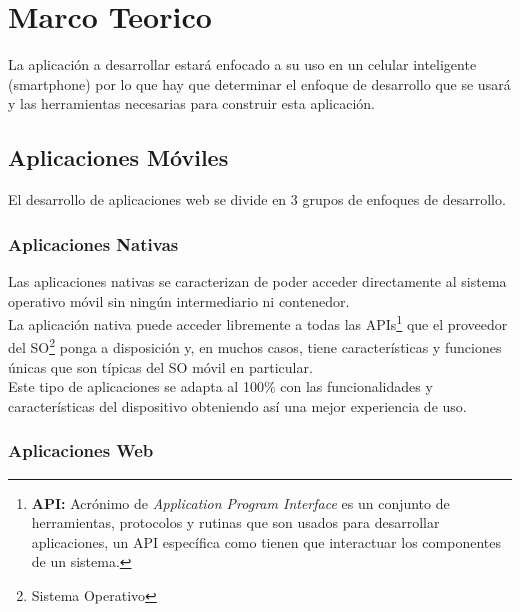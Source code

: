 \chapter{Marco Teorico} %
\label{cha:marco_teorico}

La aplicación a desarrollar estará enfocado a su uso en un celular inteligente (smartphone) por lo que hay que determinar el enfoque de desarrollo que se usará y las herramientas necesarias para construir esta aplicación.


  \section{Aplicaciones Móviles}
  \label{sec:aplicaciones_moviles}

    El desarrollo de aplicaciones web se divide en 3 grupos de enfoques de desarrollo.\\

    \subsection{Aplicaciones Nativas}
    \label{sub:aplicaciones_nativas}

    Las aplicaciones nativas se caracterizan de poder acceder directamente al sistema operativo móvil sin ningún intermediario ni contenedor.\\

    La aplicación nativa puede acceder libremente a todas las APIs\footnote{\textbf{API:} Acrónimo de \emph{Application Program Interface} es un conjunto de herramientas, protocolos y rutinas que son usados para desarrollar aplicaciones, un API específica como tienen que interactuar los componentes de un sistema.} que el proveedor del SO\footnote{Sistema Operativo} ponga a disposición y, en muchos casos, tiene características y funciones únicas que son típicas del SO móvil en particular.\\

    Este tipo de aplicaciones se adapta al 100\% con las funcionalidades y características del dispositivo obteniendo así una mejor experiencia de uso.\\


    \subsection{Aplicaciones Web}
    \label{sub:aplicaciones_web}

